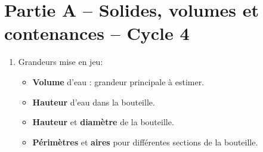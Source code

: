 \def\theme{Devoir sur temps libre 3}
\def\date{20/01/2024}

\newcommand*{\grandeurs}[1]{
    Grandeurs mise en jeu:
    \begin{itemize}
        #1
    \end{itemize}
}

\section*{Partie A – Solides, volumes et contenances – Cycle 4}
\begin{enumerate}[label=\textbf{\color{red}\alph*.}]
    \item \grandeurs{
        \item \textbf{Volume} d'eau : grandeur principale à estimer.
        \item \textbf{Hauteur} d'eau dans la bouteille.
        \item \textbf{Hauteur} et \textbf{diamètre} de la bouteille.
        \item \textbf{Périmètres} et \textbf{aires} pour différentes sections de la bouteille.
    }


\end{enumerate}
